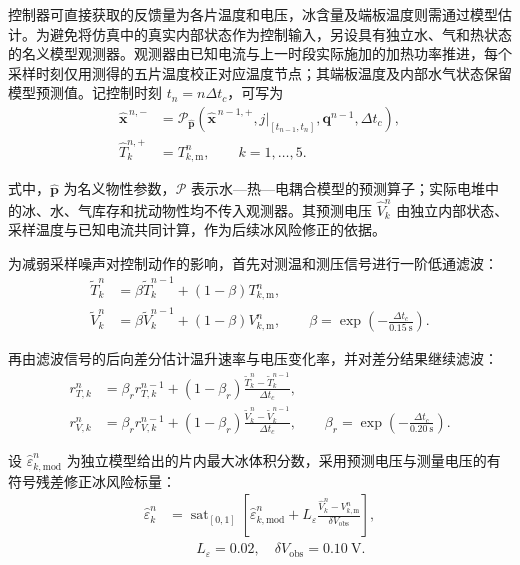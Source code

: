 \documentclass[bwprint]{gmcmthesis}
\numberwithin{figure}{section}
\begin{document}
控制器可直接获取的反馈量为各片温度和电压，冰含量及端板温度则需通过模型估计。为避免将仿真中的真实内部状态作为控制输入，另设具有独立水、气和热状态的名义模型观测器。观测器由已知电流与上一时段实际施加的加热功率推进，每个采样时刻仅用测得的五片温度校正对应温度节点；其端板温度及内部水气状态保留模型预测值。记控制时刻 $t_n=n\Delta t_c$，可写为
\begin{equation}
\begin{aligned}
\widehat{\boldsymbol x}^{\,n,-}
&=\mathcal P_{\widehat{\boldsymbol p}}\!\left(
\widehat{\boldsymbol x}^{\,n-1,+},j|_{[t_{n-1},t_n]},\boldsymbol q^{n-1},\Delta t_c\right),
\\
\widehat T_k^{n,+}&=T_{k,\mathrm m}^n,\qquad k=1,\ldots,5.
\end{aligned}
\tag{7-11}\label{eq:q4:independent_observer}
\end{equation}

式中，$\widehat{\boldsymbol p}$ 为名义物性参数，$\mathcal P$ 表示水—热—电耦合模型的预测算子；实际电堆中的冰、水、气库存和扰动物性均不传入观测器。其预测电压 $\widehat V_k^n$ 由独立内部状态、采样温度与已知电流共同计算，作为后续冰风险修正的依据。

为减弱采样噪声对控制动作的影响，首先对测温和测压信号进行一阶低通滤波：
\begin{equation}
\begin{aligned}
\widetilde T_k^n&=\beta\widetilde T_k^{n-1}+(1-\beta)T_{k,\mathrm m}^n,\\
\widetilde V_k^n&=\beta\widetilde V_k^{n-1}+(1-\beta)V_{k,\mathrm m}^n,
\qquad \beta=\exp\!\left(-\frac{\Delta t_c}{0.15\ \mathrm s}\right).
\end{aligned}
\tag{7-12}\label{eq:q4:signal_filter}
\end{equation}

再由滤波信号的后向差分估计温升速率与电压变化率，并对差分结果继续滤波：
\begin{equation}
\begin{aligned}
r_{T,k}^n&=\beta_r r_{T,k}^{n-1}+(1-\beta_r)
\frac{\widetilde T_k^n-\widetilde T_k^{n-1}}{\Delta t_c},\\
r_{V,k}^n&=\beta_r r_{V,k}^{n-1}+(1-\beta_r)
\frac{\widetilde V_k^n-\widetilde V_k^{n-1}}{\Delta t_c},\qquad
\beta_r=\exp\!\left(-\frac{\Delta t_c}{0.20\ \mathrm s}\right).
\end{aligned}
\tag{7-13}\label{eq:q4:rate_filter}
\end{equation}

设 $\widehat\varepsilon_{k,\mathrm{mod}}^n$ 为独立模型给出的片内最大冰体积分数，采用预测电压与测量电压的有符号残差修正冰风险标量：
\begin{equation}
\begin{aligned}
\widehat\varepsilon_k^n
&=\operatorname{sat}_{[0,1]}\!\left[
\widehat\varepsilon_{k,\mathrm{mod}}^n
+L_\varepsilon\frac{\widehat V_k^n-V_{k,\mathrm m}^n}{\delta V_{\mathrm{obs}}}\right],
\\
&\qquad L_\varepsilon=0.02,\quad\delta V_{\mathrm{obs}}=0.10\ \mathrm V.
\end{aligned}
\tag{7-14}\label{eq:q4:ice_estimator}
\end{equation}
\end{document}
